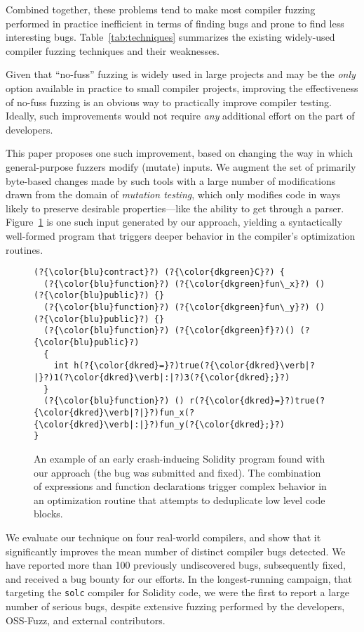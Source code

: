   Combined together, these problems tend to make most compiler fuzzing
  performed in practice inefficient in
  terms of finding bugs and prone to find less interesting bugs.
  Table~\ref{tab:techniques} summarizes the existing widely-used
  compiler fuzzing techniques and their weaknesses.

  Given that ``no-fuss'' fuzzing is widely used in large projects and
  may be the \emph{only} option available in
  practice to small compiler projects, improving the effectiveness of no-fuss fuzzing is an obvious way to practically improve compiler
  testing.  Ideally, such improvements would not require \emph{any}
  additional effort on the part of developers.

  This paper proposes one such improvement, based on changing the way
  in which general-purpose fuzzers modify (mutate) inputs.  We augment
  the set of primarily byte-based changes made by such tools with a large number of
  modifications drawn from the domain of \emph{mutation testing},
  which only modifies code in ways likely to preserve desirable
  properties---like the ability to get through a parser. Figure~\ref{lst:sol-exemplar}
  is one such input generated by our approach, yielding a syntactically well-formed program that
  triggers deeper behavior in the compiler's optimization routines.

\begin{figure}[h!]
\begin{lstlisting}[basicstyle=\scriptsize\ttfamily,numbers=none,xleftmargin=0.7em,xrightmargin=.7em]
(?{\color{blu}contract}?) (?{\color{dkgreen}C}?) {
  (?{\color{blu}function}?) (?{\color{dkgreen}fun\_x}?) () (?{\color{blu}public}?) {}
  (?{\color{blu}function}?) (?{\color{dkgreen}fun\_y}?) () (?{\color{blu}public}?) {}
  (?{\color{blu}function}?) (?{\color{dkgreen}f}?)() (?{\color{blu}public}?)
  {
    int h(?{\color{dkred}=}?)true(?{\color{dkred}\verb|?|}?)1(?\color{dkred}\verb|:|?)3(?{\color{dkred};}?)
  }
  (?{\color{blu}function}?) () r(?{\color{dkred}=}?)true(?{\color{dkred}\verb|?|}?)fun_x(?{\color{dkred}\verb|:|}?)fun_y(?{\color{dkred};}?)
}
\end{lstlisting}
\caption{An example of an early crash-inducing Solidity program found
  with our approach (the bug was submitted and fixed). The combination of expressions and function declarations trigger complex behavior in an optimization routine that attempts to deduplicate low level code blocks.}
\label{lst:sol-exemplar}
\end{figure}

  We evaluate
  our technique on four real-world compilers, and show that it
  significantly improves the mean number of distinct compiler bugs
  detected.  We have reported more than
  100 previously undiscovered 
  bugs, subsequently fixed, and received a bug bounty for
  our efforts.  In the longest-running campaign, that targeting the
  {\tt solc} compiler for Solidity code, we were the first to
  report a large number of serious bugs, despite extensive
  fuzzing  performed by the developers, OSS-Fuzz,
  and external contributors.
